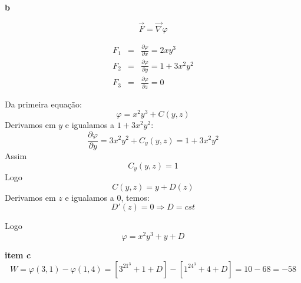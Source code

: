 \documentclass[a4paper,10pt]{book}
\begin{document}
{\bf b}

$$\vec{F}=\vec{\nabla}\varphi$$

\begin{eqnarray*}
 F_1 &=& \frac{\partial \varphi}{\partial x}=2xy^3\\
 F_2 &=& \frac{\partial \varphi}{\partial y}=1+3x^2y^2\\
 F_3 &=& \frac{\partial \varphi}{\partial z}=0
\end{eqnarray*}

Da primeira equação:
$$\varphi=x^2y^3+C(y,z)$$
Derivamos em $y$ e igualamos a $1+3x^2y^2$:
$$\frac{\partial \varphi}{\partial y}=3x^2y^2+C_y(y,z)=1+3x^2y^2$$
Assim
$$C_y(y,z)=1$$
Logo
$$C(y,z)=y+D(z)$$
Derivamos em $z$ e igualamos a $0$, temos:
$$D'(z)=0\Longrightarrow D=cst$$

Logo
$$\varphi=x^2y^3+y+D $$

{\bf item c}
$$W=\varphi(3,1)-\varphi(1,4)=\left[3^21^3+1+D\right]-\left[1^24^3+4+D\right]=10-68=-58$$
\end{document}
